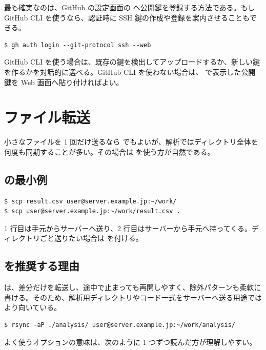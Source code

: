最も確実なのは、GitHub の設定画面の  へ公開鍵を登録する方法である。もし GitHub CLI  を使うなら、認証時に SSH 鍵の作成や登録を案内させることもできる。

\begin{lstlisting}[numbers=none, xleftmargin=2\zw]
$ gh auth login --git-protocol ssh --web
\end{lstlisting}

GitHub CLI を使う場合は、既存の鍵を検出してアップロードするか、新しい鍵を作るかを対話的に選べる。GitHub CLI を使わない場合は、 で表示した公開鍵を Web 画面へ貼り付ければよい。

\section{ファイル転送}

小さなファイルを 1 回だけ送るなら  でもよいが、解析ではディレクトリ全体を何度も同期することが多い。その場合は  を使う方が自然である。

\subsection{ の最小例}

\begin{lstlisting}[numbers=none, xleftmargin=2\zw]
$ scp result.csv user@server.example.jp:~/work/
$ scp user@server.example.jp:~/work/result.csv .
\end{lstlisting}

1 行目は手元からサーバーへ送り、2 行目はサーバーから手元へ持ってくる。ディレクトリごと送りたい場合は  を付ける。

\subsection{ を推奨する理由}

 は、差分だけを転送し、途中で止まっても再開しやすく、除外パターンも柔軟に書ける。そのため、解析用ディレクトリやコード一式をサーバーへ送る用途では  より向いている。

\begin{lstlisting}[numbers=none, xleftmargin=2\zw]
$ rsync -aP ./analysis/ user@server.example.jp:~/work/analysis/
\end{lstlisting}

よく使うオプションの意味は、次のように 1 つずつ読んだ方が理解しやすい。

